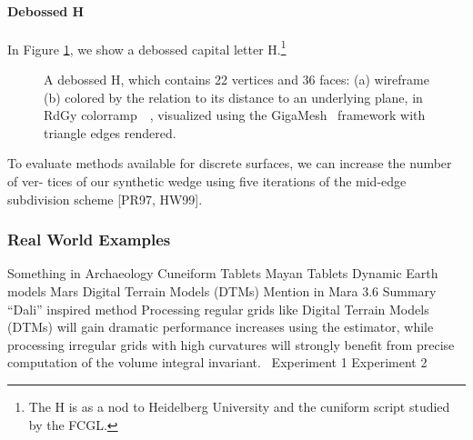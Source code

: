 \documentclass{article}
\begin{document}
\paragraph{Debossed H}
In Figure \ref{fig:h}, we show a debossed capital letter H.\footnote{The H is as a nod to Heidelberg University and the cuniform script studied by the FCGL.}
\begin{figure}[ht]
\centering
\subfloat[wireframe]{
  \resizebox{0.48\linewidth}{!}{}
  \label{fig:h.a}}
\caption[A debossed H, which contains 22 vertices and 36 faces.]{A debossed H, which contains 22 vertices and 36 faces: (a) wireframe (b) colored by the relation to its distance to an underlying plane, in RdGy colorramp~\cite[p.~???]{Brewer2003}~\cite[p.~19]{Giga17}, visualized using the GigaMesh~\cite{Mara10} framework with triangle edges rendered.}\label{fig:h}
\end{figure}

To evaluate methods available for discrete surfaces, we can increase the number of ver-
tices of our synthetic wedge using five iterations of the mid-edge subdivision scheme [PR97,
HW99].~\cite[p.~38]{Mara12}
\subsubsection{Real World Examples}
Something in Archaeology
Cuneiform Tablets
Mayan Tablets
Dynamic Earth models
Mars
Digital Terrain Models (DTMs) Mention in Mara 3.6 Summary “Dali” inspired method
Processing regular grids like Digital Terrain Models (DTMs) will gain dramatic performance increases using the estimator, while processing irregular grids with high curvatures will strongly benefit from precise computation of the volume integral invariant.~\cite[p.~143]{Mara12}
Experiment 1
Experiment 2
\end{document}
